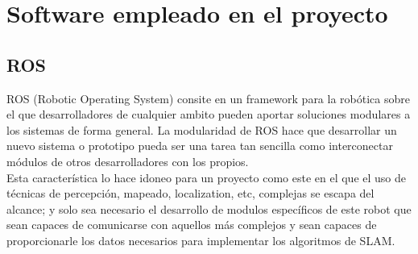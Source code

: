 \section{Software empleado en el proyecto}
\subsection{ROS}
ROS (Robotic Operating System) consite en un framework para la robótica sobre el que desarrolladores de cualquier 
ambito pueden aportar soluciones modulares a los sistemas de forma general. La modularidad de ROS hace que desarrollar 
un nuevo sistema o prototipo pueda ser una tarea tan sencilla como interconectar módulos de otros desarrolladores con 
los propios.\\
Esta característica lo hace idoneo para un proyecto como este en el que el uso de técnicas de percepción, 
mapeado, localization, etc, complejas se escapa del alcance; y solo sea necesario el desarrollo de modulos específicos de este robot
que sean capaces de comunicarse con aquellos más complejos y sean capaces de proporcionarle los datos necesarios para implementar los
algoritmos de SLAM.
